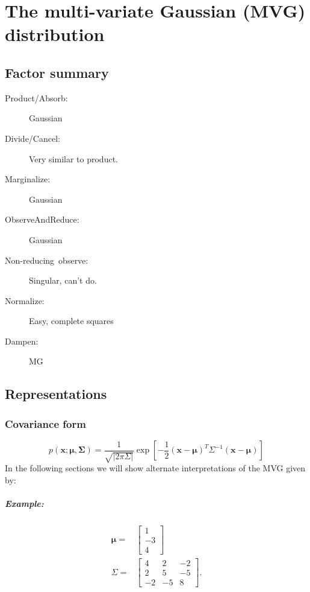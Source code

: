 \chapter{The multi-variate Gaussian (MVG) distribution}


\section{Factor summary}
\begin{description}
\item [{Product/Absorb:}] Gaussian
\item [{Divide/Cancel:}] Very similar to product.
\item [{Marginalize:}] Gaussian
\item [{ObserveAndReduce:}] Gaussian
\item [{Non-reducing~observe:}] Singular, can't do.
\item [{Normalize:}] Easy, complete squares
\item [{Dampen:}] MG
\end{description}

\section{Representations}


\subsection{Covariance form}

\begin{equation}
p(\mathbf{x;\mathbf{\mu},\mathbf{\Sigma}})=\frac{1}{\sqrt{|2\pi\Sigma|}}\exp\left[-\frac{1}{2}(\mathbf{x}-\mathbf{\mu})^{T}\Sigma^{-1}(\mathbf{x}-\mathbf{\mu})\right]
\end{equation}
 In the following sections we will show alternate interpretations
of the MVG given by:


\paragraph{Example:}

\begin{align*}
\mathbf{\mu=} & \left[\begin{array}{r}
1\\
-3\\
4
\end{array}\right]\\
\Sigma= & \left[\begin{array}{rrr}
4 & 2 & -2\\
2 & 5 & -5\\
-2 & -5 & 8
\end{array}\right].
\end{align*}


